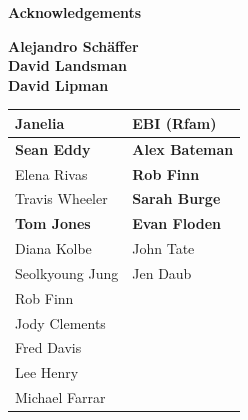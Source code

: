 \documentclass[landscape]{slides}
\begin{document}
\begin{slide}

\large
\begin{center}
\large{\textbf{Acknowledgements}} \\

\vspace{0.5in}

\textbf{Alejandro Sch\"{a}ffer} \\
\textbf{David Landsman} \\
\textbf{David Lipman}

\vspace{0.5in}

\normalsize
\begin{tabular}{l|l}
\textbf{Janelia} & \textbf{EBI (Rfam)} \\ \hline
{\bf Sean Eddy}     & {\bf Alex Bateman} \\
Elena Rivas         & {\bf Rob Finn} \\
Travis Wheeler      & {\bf Sarah Burge} \\ 
{\bf Tom Jones}     & {\bf Evan Floden} \\
Diana Kolbe         & John Tate \\
Seolkyoung Jung     & Jen Daub \\
Rob Finn            & \\
Jody Clements       & \\
Fred Davis          & \\
Lee Henry           & \\
Michael Farrar      & \\
\end{tabular}


\end{center}

\vfill
\end{slide}
\end{document}
